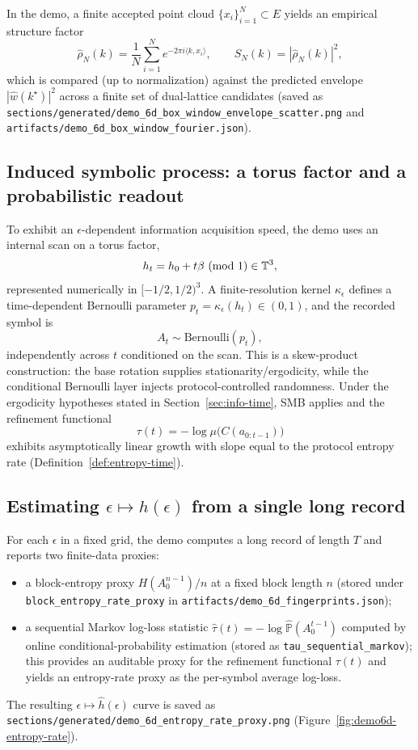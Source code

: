 In the demo, a finite accepted point cloud $\{x_i\}_{i=1}^N\subset E$ yields an empirical structure factor
\[
\widehat\rho_N(k)=\frac{1}{N}\sum_{i=1}^N e^{-2\pi i\langle k,x_i\rangle},
\qquad
S_N(k)=|\widehat\rho_N(k)|^2,
\]
which is compared (up to normalization) against the predicted envelope $|\widehat w(k^\star)|^2$ across a finite set of dual-lattice candidates (saved as \texttt{sections/generated/demo\_6d\_box\_window\_envelope\_scatter.png} and \texttt{artifacts/demo\_6d\_box\_window\_fourier.json}).

\subsection{Induced symbolic process: a torus factor and a probabilistic readout}
To exhibit an $\epsilon$-dependent information acquisition speed, the demo uses an internal scan on a torus factor,
\[
h_t=h_0+t\beta\ (\mathrm{mod}\ 1)\in\TT^3,
\]
represented numerically in $[-1/2,1/2)^3$. A finite-resolution kernel $\kappa_\epsilon$ defines a time-dependent Bernoulli parameter $p_t=\kappa_\epsilon(h_t)\in(0,1)$, and the recorded symbol is
\[
A_t\sim\mathrm{Bernoulli}(p_t),
\]
independently across $t$ conditioned on the scan. This is a skew-product construction: the base rotation supplies stationarity/ergodicity, while the conditional Bernoulli layer injects protocol-controlled randomness. Under the ergodicity hypotheses stated in Section~\ref{sec:info-time}, SMB applies and the refinement functional
\[
\tau(t)=-\log\mu\bigl(C(a_{0:t-1})\bigr)
\]
exhibits asymptotically linear growth with slope equal to the protocol entropy rate (Definition~\ref{def:entropy-time}).

\subsection{Estimating $\epsilon\mapsto h(\epsilon)$ from a single long record}
For each $\epsilon$ in a fixed grid, the demo computes a long record of length $T$ and reports two finite-data proxies:
\begin{itemize}[leftmargin=*,itemsep=2pt]
  \item a block-entropy proxy $H(A_0^{n-1})/n$ at a fixed block length $n$ (stored under \texttt{block\_entropy\_rate\_proxy} in \texttt{artifacts/demo\_6d\_fingerprints.json});
  \item a sequential Markov log-loss statistic $\widehat{\tau}(t)=-\log \widehat{\mathbb{P}}(A_0^{t-1})$ computed by online conditional-probability estimation (stored as \texttt{tau\_sequential\_markov}); this provides an auditable proxy for the refinement functional $\tau(t)$ and yields an entropy-rate proxy as the per-symbol average log-loss.
\end{itemize}
The resulting $\epsilon\mapsto \widehat h(\epsilon)$ curve is saved as \texttt{sections/generated/demo\_6d\_entropy\_rate\_proxy.png} (Figure~\ref{fig:demo6d-entropy-rate}).

